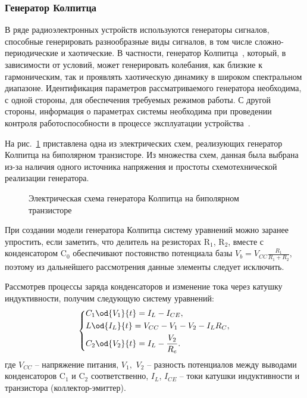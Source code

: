 \FloatBarrier
\subsubsection{Генератор Колпитца} %


В ряде радиоэлектронных устройств используются
генераторы сигналов, способные генерировать разнообразные виды  сигналов, в том числе
сложно-периодические и хаотические.
В частности, генератор  Колпитца~\cite{kennedy_chaos_colpitts,atu_asau21}, который, в
зависимости от условий,   может
генерировать  колебания,  как  близкие  к  гармоническим,  так  и  проявлять
хаотическую  динамику  в  широком  спектральном   диапазоне.   Идентификация
параметров рассматриваемого генератора  необходима,  с  одной  стороны,  для
обеспечения  требуемых  режимов  работы.  С  другой  стороны,  информация  о
параметрах системы необходима при проведении  контроля  работоспособности  в
процессе эксплуатации устройства~\cite{atu_apir2013}.

На рис.~\ref{atu:f:colp_schem} приставлена одна из электрических схем,
реализующих генератор Колпитца на биполярном транзисторе.
Из множества схем, данная была выбрана из-за наличия
одного источника напряжения и простоты схемотехнической реализации генератора.


\begin{figure}[htb!]
\begin{center}

\end{center}
\caption{Электрическая схема генератора Колпитца на биполярном транзисторе}
\label{atu:f:colp_schem}
\end{figure}

При создании модели генератора Колпитца систему уравнений можно
заранее упростить, если заметить, что
делитель на резисторах
$\mathrm{R}_1$, $\mathrm{R}_2$,
вместе с конденсатором
$\mathrm{C}_0$ обеспечивают
постоянство потенциала базы
$V_b = V_{CC} \frac{R_1}{R_1+R_2}$,
поэтому из дальнейшего рассмотрения данные элементы следует
исключить.

Рассмотрев процессы заряда конденсаторов и изменение тока через
катушку индуктивности, получим следующую систему уравнений:
%
\begin{equation}
\label{atu:eq:colp_phys}
\begin{dcases}
  C_1 \od{V_{1}}{t}  = I_L - I_{CE} , \\
  L   \od{I_L}{t}    = V_{CC} - V_{1} - V_{2} - I_L R_C , \\
  C_2 \od{V_{2}}{t}  = I_L - \frac{V_{2}}{R_e}.
\end{dcases}
\end{equation}
%
%
где
$V_{CC} $ -- напряжение питания,
$V_1,$ $V_2$ -- разность потенциалов между выводами конденсаторов
$\mathrm{C}_1$ и $\mathrm{C}_2$ соответственно,
$I_L$, $I_{CE}$ -- токи катушки индуктивности и транзистора (коллектор-эмиттер).

